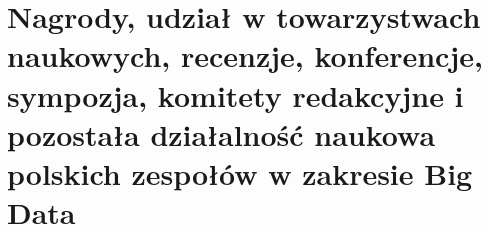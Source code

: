 \section{Nagrody, udział w towarzystwach naukowych, recenzje, konferencje, sympozja, komitety redakcyjne i pozostała działalność naukowa polskich zespołów w zakresie Big Data}
\label{sec:nagrody_udzia_w_towarzystwach_naukowych_recenzje_konferencje_sympozja_komitety_redakcyjne_i_pozosta_a_dzia_alno_naukowa_polskich_zespo_w_w_zakresie_big_data}


